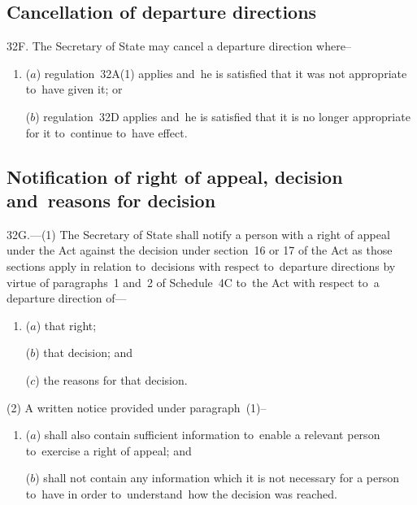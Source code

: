 \documentclass[12pt,a4paper]{article}
\begin{document}
\enlargethispage{\baselineskip}

\subsection[32F. Cancellation of departure directions]{Cancellation of departure directions}

32F.  The Secretary of State may cancel a departure direction where–
\begin{enumerate}\item[]
($a$) regulation~32A(1) applies and~he is satisfied that it was not appropriate to~have given it; or

($b$) regulation~32D applies and~he is satisfied that it is no longer appropriate for it to~continue to~have effect.
\end{enumerate}


\subsection[32G. Notification of right of appeal, decision and~reasons for decision]{Notification of right of appeal, decision and~reasons for decision}

32G.—(1) The Secretary of State shall notify a person with a right of appeal under the Act against the decision under section~16 or 17 of the Act as those sections apply in relation to~decisions with respect to~departure directions by virtue of paragraphs~1 and~2 of Schedule~4C to~the Act with respect to~a departure direction of---
\begin{enumerate}\item[]
($a$) that right;

($b$) that decision; and

($c$) the reasons for that decision.
\end{enumerate}

(2) A written notice provided under paragraph~(1)–
\begin{enumerate}\item[]
($a$) shall also contain sufficient information to~enable a relevant person to~exercise a right of appeal; and

($b$) shall not contain any information which it is not necessary for a person to~have in order to~understand~how the decision was reached.
\end{enumerate}
\end{document}
